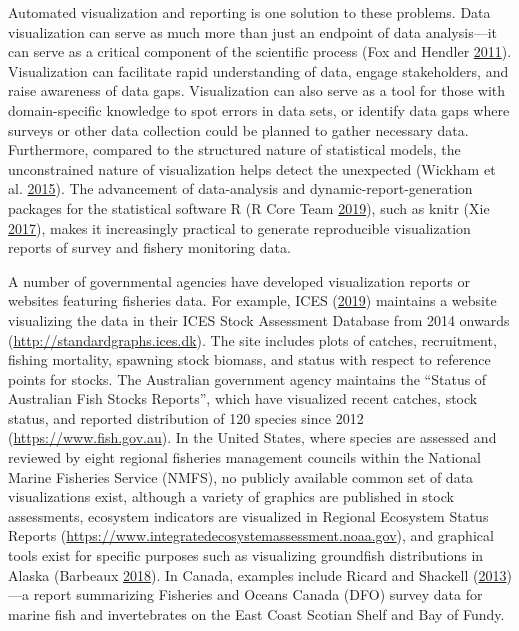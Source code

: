 \documentclass[12pt,]{article}
\begin{document}
Automated visualization and reporting is one solution to these problems. Data visualization can serve as much more than just an endpoint of data analysis---it can serve as a critical component of the scientific process (Fox and Hendler \protect\hyperlink{ref-fox2011}{2011}). Visualization can facilitate rapid understanding of data, engage stakeholders, and raise awareness of data gaps. Visualization can also serve as a tool for those with domain-specific knowledge to spot errors in data sets, or identify data gaps where surveys or other data collection could be planned to gather necessary data. Furthermore, compared to the structured nature of statistical models, the unconstrained nature of visualization helps detect the unexpected (Wickham et al. \protect\hyperlink{ref-wickham2015}{2015}). The advancement of data-analysis and dynamic-report-generation packages for the statistical software R (R Core Team \protect\hyperlink{ref-r2019}{2019}), such as knitr (Xie \protect\hyperlink{ref-xie2017}{2017}), makes it increasingly practical to generate reproducible visualization reports of survey and fishery monitoring data.

A number of governmental agencies have developed visualization reports or websites featuring fisheries data.
For example, ICES (\protect\hyperlink{ref-ices2019}{2019}) maintains a website visualizing the data in their ICES Stock Assessment Database from 2014 onwards (\url{http://standardgraphs.ices.dk}).
The site includes plots of catches, recruitment, fishing mortality, spawning stock biomass, and status with respect to reference points for stocks.
The Australian government agency maintains the ``Status of Australian Fish Stocks Reports'', which have visualized recent catches, stock status, and reported distribution of 120 species since 2012 (\url{https://www.fish.gov.au}).
In the United States, where species are assessed and reviewed by eight regional fisheries management councils within the National Marine Fisheries Service (NMFS), no publicly available common set of data visualizations exist, although a variety of graphics are published in stock assessments, ecosystem indicators are visualized in Regional Ecosystem Status Reports (\url{https://www.integratedecosystemassessment.noaa.gov}), and graphical tools exist for specific purposes such as visualizing groundfish distributions in Alaska (Barbeaux \protect\hyperlink{ref-barbeaux2018}{2018}).
In Canada, examples include Ricard and Shackell (\protect\hyperlink{ref-ricard2013}{2013})---a report summarizing Fisheries and Oceans Canada (DFO) survey data for marine fish and invertebrates on the East Coast Scotian Shelf and Bay of Fundy.
\end{document}
